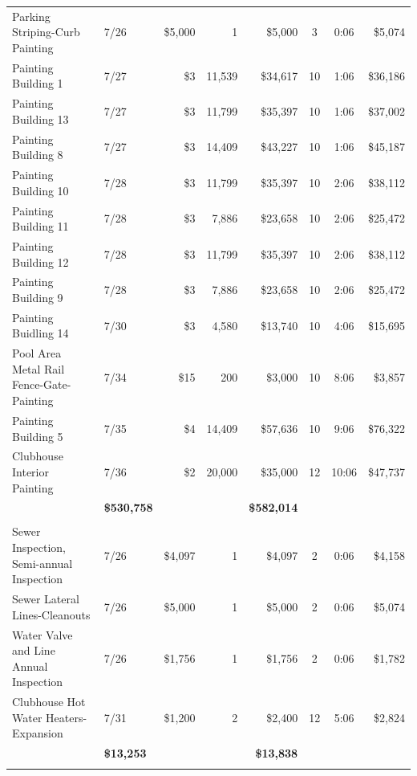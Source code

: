 \documentclass[11pt,letterpaper]{article}
\begin{document}
\begin{longtable}{p{4.2cm} p{1.6cm} r r r c c r}
\rowcolor{blue!12} Parking Striping-Curb Painting & 7/26 & \$5,000 & 1 & \$5,000 & 3 & 0:06 & \$5,074 \\
Painting Building 1 & 7/27 & \$3 & 11,539 & \$34,617 & 10 & 1:06 & \$36,186 \\
\rowcolor{blue!12} Painting Building 13 & 7/27 & \$3 & 11,799 & \$35,397 & 10 & 1:06 & \$37,002 \\
Painting Building 8 & 7/27 & \$3 & 14,409 & \$43,227 & 10 & 1:06 & \$45,187 \\
\rowcolor{blue!12} Painting Building 10 & 7/28 & \$3 & 11,799 & \$35,397 & 10 & 2:06 & \$38,112 \\
Painting Building 11 & 7/28 & \$3 & 7,886 & \$23,658 & 10 & 2:06 & \$25,472 \\
\rowcolor{blue!12} Painting Building 12 & 7/28 & \$3 & 11,799 & \$35,397 & 10 & 2:06 & \$38,112 \\
Painting Building 9 & 7/28 & \$3 & 7,886 & \$23,658 & 10 & 2:06 & \$25,472 \\
\rowcolor{blue!12} Painting Buidling 14 & 7/30 & \$3 & 4,580 & \$13,740 & 10 & 4:06 & \$15,695 \\
Pool Area Metal Rail Fence-Gate-Painting & 7/34 & \$15 & 200 & \$3,000 & 10 & 8:06 & \$3,857 \\
\rowcolor{blue!12} Painting Building 5 & 7/35 & \$4 & 14,409 & \$57,636 & 10 & 9:06 & \$76,322 \\
Clubhouse Interior Painting & 7/36 & \$2 & 20,000 & \$35,000 & 12 & 10:06 & \$47,737 \\
\addlinespace[1pt] \multicolumn{4}{r}{} & \textbf{\$530,758} & & & \textbf{\$582,014} \\
\addlinespace[6pt]
\multicolumn{8}{l}{\textbf{Plumbing}} \\
\rowcolor{blue!12} Sewer Inspection, Semi-annual Inspection & 7/26 & \$4,097 & 1 & \$4,097 & 2 & 0:06 & \$4,158 \\
Sewer Lateral Lines-Cleanouts & 7/26 & \$5,000 & 1 & \$5,000 & 2 & 0:06 & \$5,074 \\
\rowcolor{blue!12} Water Valve and Line Annual Inspection & 7/26 & \$1,756 & 1 & \$1,756 & 2 & 0:06 & \$1,782 \\
Clubhouse Hot Water Heaters-Expansion & 7/31 & \$1,200 & 2 & \$2,400 & 12 & 5:06 & \$2,824 \\
\addlinespace[1pt] \multicolumn{4}{r}{} & \textbf{\$13,253} & & & \textbf{\$13,838} \\
\addlinespace[6pt]
\multicolumn{8}{l}{\textbf{Renovation}} \\

\end{longtable}
\end{document}
